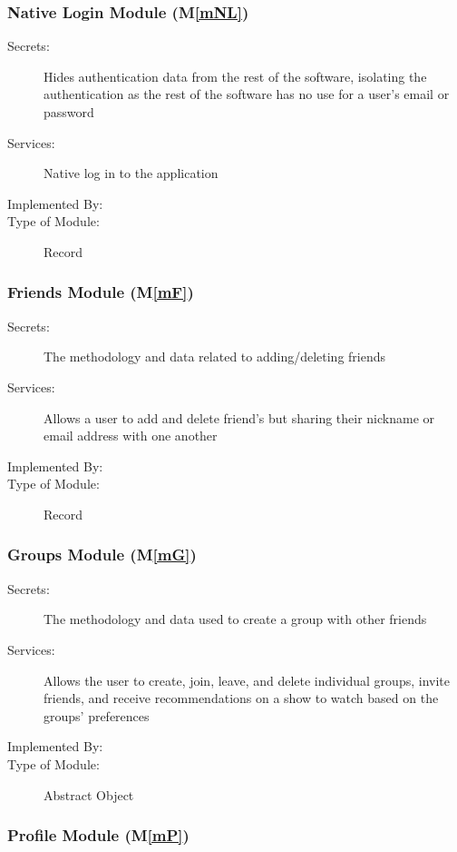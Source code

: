 \documentclass[12pt, titlepage]{article}
\newcommand{\mref}[1]{M\ref{#1}}
\begin{document}
\subsubsection{Native Login Module (\mref{mNL})}

\begin{description}
\item[Secrets:] Hides authentication data from the rest of the software, isolating the authentication as the rest of the software has no use for a user's email or password
\item[Services:] Native log in to the application
\item[Implemented By:] \progname
\item[Type of Module:] Record
\end{description}

\subsubsection{Friends Module (\mref{mF})}

\begin{description}
\item[Secrets:] The methodology and data related to adding/deleting friends
\item[Services:] Allows a user to add and delete friend's but sharing their nickname or email address with one another
\item[Implemented By:] \progname
\item[Type of Module:] Record
\end{description}

\subsubsection{Groups Module (\mref{mG})}

\begin{description}
\item[Secrets:] The methodology and data used to create a group with other friends
\item[Services:] Allows the user to create, join, leave, and delete individual groups, invite friends, and receive recommendations on a show to watch based on the groups' preferences
\item[Implemented By:] \progname
\item[Type of Module:] Abstract Object
\end{description}

\subsubsection{Profile Module (\mref{mP})}
\end{document}
